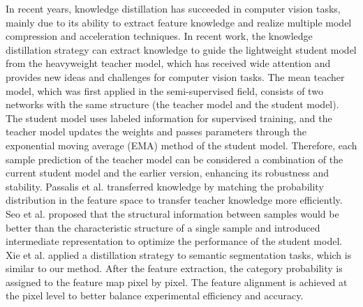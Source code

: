 \documentclass[sn-mathphys]{sn-jnl}%
\theoremstyle{thmstyleone}%
\theoremstyle{thmstyletwo}%
\theoremstyle{thmstylethree}%
\begin{document}
In recent years, knowledge distillation\cite{liu2020structured,xu2020exploring} has succeeded in computer vision tasks, mainly due to its ability to extract feature knowledge and realize multiple model compression and acceleration techniques. In recent work, the knowledge distillation strategy can extract knowledge to guide the lightweight student model from the heavyweight teacher model, which has received wide attention and provides new ideas and challenges for computer vision tasks. The mean teacher model, which was first applied in the semi-supervised field, consists of two networks with the same structure (the teacher model and the student model). The student model uses labeled information for supervised training, and the teacher model updates the weights and passes parameters through the exponential moving average (EMA) method of the student model. Therefore, each sample prediction of the teacher model can be considered a combination of the current student model and the earlier version, enhancing its robustness and stability. Passalis et al.\cite{passalis2018learning,passalis2020probabilistic} transferred knowledge by matching the probability distribution in the feature space to transfer teacher knowledge more efficiently. Seo et al.\cite{seo2020federated} proposed that the structural information between samples would be better than the characteristic structure of a single sample and introduced intermediate representation to optimize the performance of the student model. Xie et al.\cite{xie2018improving} applied a distillation strategy to semantic segmentation tasks, which is similar to our method. After the feature extraction, the category probability is assigned to the feature map pixel by pixel. The feature alignment is achieved at the pixel level to better balance experimental efficiency and accuracy. 
\end{document}
